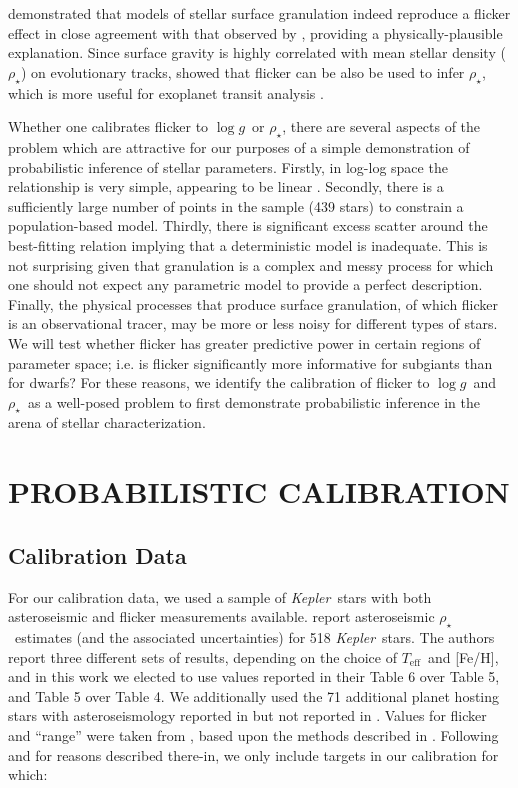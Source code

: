 \documentclass[apjl]{emulateapj}
\newcommand{\logg}{$\log g$}
\newcommand{\rhostar}{$\rho_{\star}$}
\newcommand{\Teff}{$T_{\mathrm{eff}}$}
\newcommand{\FeH}{[Fe/H]}
\newcommand{\Kepler}{\textit{Kepler}}
\begin{document}
\citet{cranmer:2014} demonstrated that models of stellar surface granulation
indeed reproduce a flicker effect in close agreement with that observed by
\citet{bastien:2013}, providing a physically-plausible explanation.
Since surface gravity is highly correlated with mean stellar density (\rhostar)
on evolutionary tracks, \citet{kipping:2014} showed that flicker can be also
be used to infer \rhostar, which is more useful for exoplanet transit analysis
\citep{seager:2003}.

Whether one calibrates flicker to \logg\ or \rhostar, there are several aspects
of the problem which are attractive for our purposes of a simple demonstration
of probabilistic inference of stellar parameters.
Firstly, in log-log space the relationship is very simple, appearing to be
linear \citep{kipping:2014}.
Secondly, there is a sufficiently large number of points in the sample (439
stars) to constrain a population-based model.
Thirdly, there is significant excess scatter around the best-fitting relation
implying that a deterministic model is inadequate.
This is not surprising given that granulation is a complex and messy process
for which one should not expect any parametric model to provide a perfect
description.
Finally, the physical processes that produce surface granulation, of which
flicker is an observational tracer, may be more or less noisy for different
types of stars.
We will test whether flicker has greater predictive power in certain regions
of parameter space; i.e. is flicker significantly more informative for
subgiants than for dwarfs?
For these reasons, we identify the calibration of
flicker to \logg\ and \rhostar\ as a well-posed problem to first demonstrate
probabilistic inference in the arena of stellar characterization.

\section{PROBABILISTIC CALIBRATION}
\label{sec:HBM}


\subsection{Calibration Data}

For our calibration data, we used a sample of \Kepler\ stars with
both asteroseismic and flicker measurements available. \citet{chaplin:2014}
report asteroseismic \rhostar\ estimates (and the associated uncertainties) for
518 \Kepler\ stars. The authors report three different sets of results,
depending on the choice of \Teff\ and \FeH, and in this work we elected to use
values reported in their Table 6 over Table 5, and Table 5 over Table 4. We
additionally used the 71 additional planet hosting stars with asteroseismology
reported in \citet{huber:2013} but not reported in \citet{chaplin:2014}. Values
for flicker and ``range'' were taken from \citet{kipping:2014}, based upon the
methods described in \citet{bastien:2013}. Following \citet{kipping:2014} and
for reasons described there-in, we only include targets in our calibration for
which:
\end{document}
